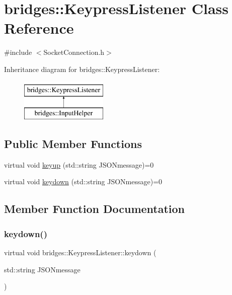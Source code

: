 \hypertarget{classbridges_1_1_keypress_listener}{}\section{bridges\+:\+:Keypress\+Listener Class Reference}
\label{classbridges_1_1_keypress_listener}


{\ttfamily \#include $<$Socket\+Connection.\+h$>$}

Inheritance diagram for bridges\+:\+:Keypress\+Listener\+:\begin{figure}[H]
\begin{center}
\leavevmode
\includegraphics[height=2.000000cm]{classbridges_1_1_keypress_listener}
\end{center}
\end{figure}
\subsection*{Public Member Functions}
\begin{DoxyCompactItemize}
\item 
virtual void \hyperlink{classbridges_1_1_keypress_listener_ad5af91d35dc485182056ca821f3ce03e}{keyup} (std\+::string J\+S\+O\+Nmessage)=0
\item 
virtual void \hyperlink{classbridges_1_1_keypress_listener_a8e94db1517b295a8fc52f5ed7ddc74d0}{keydown} (std\+::string J\+S\+O\+Nmessage)=0
\end{DoxyCompactItemize}


\subsection{Member Function Documentation}
\mbox{\label{classbridges_1_1_keypress_listener_a8e94db1517b295a8fc52f5ed7ddc74d0}} 
\subsubsection{\texorpdfstring{keydown()}{keydown()}}
{\footnotesize\ttfamily virtual void bridges\+::\+Keypress\+Listener\+::keydown (\begin{DoxyParamCaption}\item[{std\+::string}]{J\+S\+O\+Nmessage }\end{DoxyParamCaption})\hspace{0.3cm}{\ttfamily [pure virtual]}}



